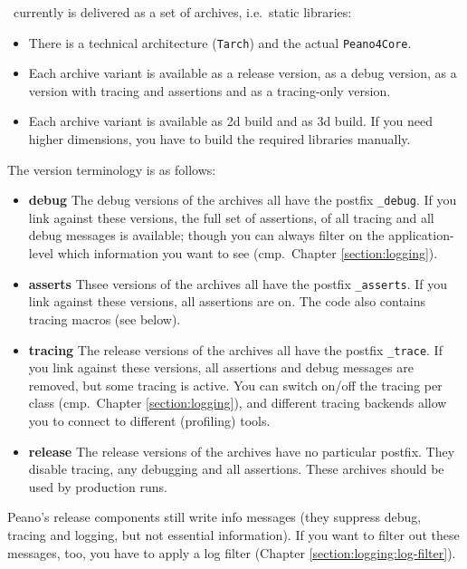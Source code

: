 \Peano\ currently is delivered as a set of archives, i.e.~static libraries:
\begin{itemize}
  \item There is a technical architecture (\texttt{Tarch}) and the actual
  \texttt{Peano4Core}.
  \item Each archive variant is available as a release version, as a debug
  version, as a version with tracing and assertions and as a tracing-only
  version.
  \item Each archive variant is available as 2d build and as 3d build. If you
  need higher dimensions, you have to build the required libraries manually.
\end{itemize}


The version terminology is as follows:
\begin{itemize}
  \item {\bf debug} The debug versions of the archives all have the postfix
  \texttt{\_debug}. If you link against these versions, the full set of
  assertions, of all tracing and all debug messages is available; though you can
  always filter on the application-level which information you want to see
  (cmp.~Chapter \ref{section:logging}).
  \item {\bf asserts} Thsee versions of the archives all have the postfix
  \texttt{\_asserts}. If you link against these versions, all assertions are on.
  The code also contains tracing macros (see below).
  \item {\bf tracing} The release versions of the archives all have the postfix
  \texttt{\_trace}. If you link against these versions, all assertions and debug
  messages are removed, but some tracing is active. You can switch on/off the
  tracing per class (cmp.~Chapter \ref{section:logging}), and different tracing
  backends allow you to connect to different (profiling) tools.
  \item {\bf release} The release versions of the archives have no
  particular postfix. They disable tracing, any debugging and all assertions.
  These archives should be used by production runs.
\end{itemize}


\begin{remark}
 Peano's release components still write info messages (they suppress debug,
 tracing and logging, but not essential information). If you want to filter out
 these messages, too, you have to apply a log filter (Chapter
 \ref{section:logging:log-filter}).
\end{remark}


